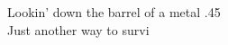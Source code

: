 \songwordfb{} Lookin' down the barrel of a  metal .45 \\
\songwordfb{} Just another way to survi \\
